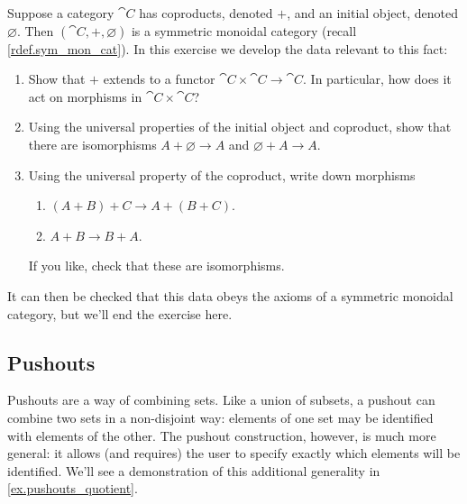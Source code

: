 \documentclass[7Sketches]{subfiles}
\begin{document}
\begin{exercise} %
\label{exc.coproducts_give_monoidal_structure}
Suppose a category $\cat C$ has coproducts, denoted $+$, and an initial object,
denoted $\varnothing$. Then $(\cat C,+,\varnothing)$ is a symmetric
monoidal category (recall \cref{rdef.sym_mon_cat}). In this exercise we develop
the data relevant to this fact: 
\begin{enumerate}
\item Show that $+$ extends to a functor $\cat C \times \cat C \to \cat C$. In particular, how does it act on morphisms in $\cat{C}\times\cat{C}$?
\item Using the universal properties of the initial object and coproduct, show
that there are isomorphisms $A+\varnothing \to A$ and $\varnothing +A \to A$.
\item Using the universal property of the coproduct, write down morphisms
\begin{enumerate}
\item $(A+B)+C \to A+(B+C)$.
\item $A+B \to B+A$.
\end{enumerate}
If you like, check that these are isomorphisms.
\end{enumerate}
It can then be checked that this data obeys the axioms of a symmetric monoidal
category, but we'll end the exercise here.
\end{exercise}

%

\subsection{Pushouts} %

Pushouts are a way of combining sets. Like a union of
subsets, a pushout can combine two sets in a non-disjoint way: elements of one
set may be identified with elements of the other. The pushout construction,
however, is much more general: it allows (and requires) the user to specify
exactly which elements will be identified. We'll see a demonstration of this
additional generality in \cref{ex.pushouts_quotient}.
\end{document}

